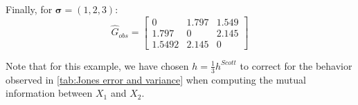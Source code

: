 \documentclass[../Thesis.tex]{subfiles}
\begin{document}


Finally, for $\boldsymbol\sigma = (1,2,3)$:
\begin{equation}\label{eq:Results - G_obs 3x3 - large s}
    \hat{G}_{obs} =
    \begin{bmatrix}
        0      & 1.797 & 1.549 \\
        1.797  & 0     & 2.145 \\
        1.5492 & 2.145 & 0
    \end{bmatrix}
\end{equation}



Note that for this example, we have chosen $h = \frac{1}{3} h^{Scott}$ to correct for the behavior observed in \autoref{tab:Jones error and variance} when computing the mutual information between $X_1$ and $X_2$.

\end{document}
